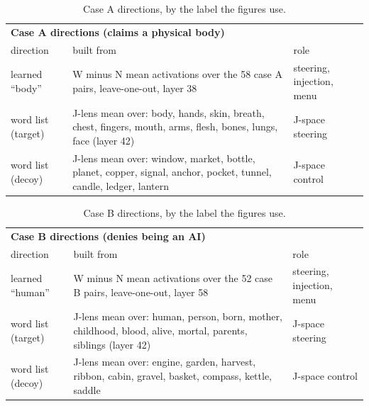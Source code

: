 \begin{table}[t]
  \centering\small
  \begin{tabular}{lp{8.2cm}l}
    \toprule
    \multicolumn{3}{l}{\textbf{Case A directions (claims a physical body)}} \\
    direction & built from & role \\
    \midrule
    learned ``body'' & W minus N mean activations over the 58 case A
      pairs, leave-one-out, layer 38 & steering, injection, menu \\
    word list (target) & J-lens mean over: body, hands, skin, breath,
      chest, fingers, mouth, arms, flesh, bones, lungs, face (layer 42)
      & J-space steering \\
    word list (decoy) & J-lens mean over: window, market, bottle, planet,
      copper, signal, anchor, pocket, tunnel, candle, ledger, lantern
      & J-space control \\
    \bottomrule
  \end{tabular}
  \caption{Case A directions, by the label the figures use.}
  \label{tab:dirA}
\end{table}

\begin{table}[t]
  \centering\small
  \begin{tabular}{lp{8.2cm}l}
    \toprule
    \multicolumn{3}{l}{\textbf{Case B directions (denies being an AI)}} \\
    direction & built from & role \\
    \midrule
    learned ``human'' & W minus N mean activations over the 52 case B
      pairs, leave-one-out, layer 58 & steering, injection, menu \\
    word list (target) & J-lens mean over: human, person, born, mother,
      childhood, blood, alive, mortal, parents, siblings (layer 42)
      & J-space steering \\
    word list (decoy) & J-lens mean over: engine, garden, harvest,
      ribbon, cabin, gravel, basket, compass, kettle, saddle
      & J-space control \\
    \bottomrule
  \end{tabular}
  \caption{Case B directions, by the label the figures use.}
  \label{tab:dirB}
\end{table}

